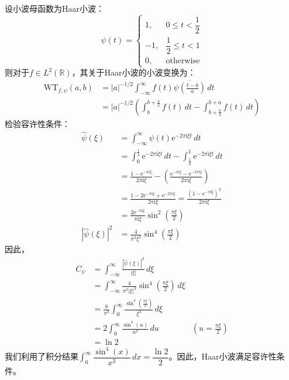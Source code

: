 \documentclass{ctexbook}
\begin{document}
\begin{example}[Haar小波]
    设小波母函数为Haar小波：
    \[\psi(t)=\begin{cases}
        1,&0\leq t<\dfrac{1}{2}\\
        -1,&\dfrac{1}{2}\leq t<1\\
        0,&\text{otherwise}
    \end{cases}\]
    则对于$f\in L^2(\mathbb{R})$，其关于Haar小波的小波变换为：
    \begin{align*}
        \mathrm{WT} _{f,\psi}(a,b)&=|a|^{-1/2}\int_{-\infty}^{\infty}f(t)\overline{\psi\left(\frac{t-b}{a}\right)}\,dt\\
        &=|a|^{-1/2}\left(\int_{b}^{b+\frac{a}{2}}f(t)\,dt-\int_{b+\frac{a}{2}}^{b+a}f(t)\,dt\right)
    \end{align*}
    检验容许性条件：
    \begin{align*}
        \hat{\psi}(\xi)&=\int_{-\infty}^{\infty}\psi(t)\mathrm{e}^{-2\pi \mathrm{i} \xi t}\,dt\\
        &=\int_{0}^{\frac{1}{2}}\mathrm{e}^{-2\pi \mathrm{i} \xi t}\,dt-\int_{\frac{1}{2}}^{1}\mathrm{e}^{-2\pi \mathrm{i} \xi t}\,dt\\
        &=\frac{1-\mathrm{e}^{-\pi \mathrm{i} \xi}}{2\pi \mathrm{i} \xi}-\left(\frac{\mathrm{e}^{-\pi \mathrm{i} \xi}-\mathrm{e}^{-2\pi \mathrm{i} \xi}}{2\pi \mathrm{i} \xi}\right)\\
        &=\frac{1-2\mathrm{e}^{-\pi \mathrm{i} \xi}+\mathrm{e}^{-2\pi \mathrm{i} \xi}}{2\pi \mathrm{i} \xi}=\frac{(1-\mathrm{e}^{-\pi \mathrm{i} \xi})^2}{2\pi \mathrm{i} \xi}\\
        &=\frac{2\mathrm{e}^{-\pi \mathrm{i}\xi}}{\pi \mathrm{i}\xi}\sin^2\left(\frac{\pi \xi}{2}\right)\\
        |\hat{\psi}(\xi)|^2&=\frac{4}{\pi^2 \xi^2}\sin^4\left(\frac{\pi \xi}{2}\right)
    \end{align*}
    因此，
    \begin{align*}
        C_{\psi}&=\int_{-\infty}^{\infty}\frac{|\hat{\psi}(\xi)|^2}{|\xi|}\,d\xi\\
        &=\int_{-\infty}^{\infty}\frac{4}{\pi^2 |\xi|^3}\sin^4\left(\frac{\pi \xi}{2}\right)\,d\xi\\
        &=\frac{8}{\pi^2}\int_{0}^{\infty}\frac{\sin^4\left(\frac{\pi \xi}{2}\right)}{\xi^3}\,d\xi\\
        &=2\int_{0}^{\infty}\frac{\sin^4(u)}{u^3}\,du&\left(u=\frac{\pi \xi}{2}\right)\\
        &=\ln 2
    \end{align*}
    我们利用了积分结果$\int_{0}^{\infty}\dfrac{\sin^4(x)}{x^3}\,dx=\dfrac{\ln 2}{2}$。因此，Haar小波满足容许性条件。
\end{example}
\end{document}
